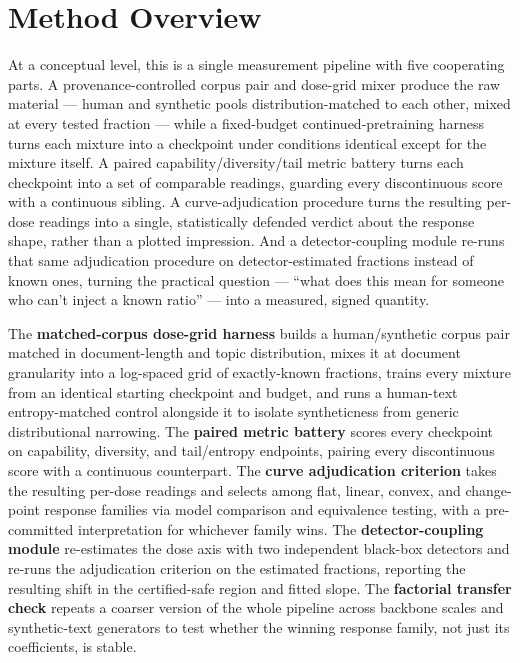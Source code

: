 \documentclass[11pt]{article}
\begin{document}
\section{Method Overview}

At a conceptual level, this is a single measurement pipeline with five cooperating parts. A provenance-controlled corpus pair and dose-grid mixer produce the raw material --- human and synthetic pools distribution-matched to each other, mixed at every tested fraction --- while a fixed-budget continued-pretraining harness turns each mixture into a checkpoint under conditions identical except for the mixture itself. A paired capability/diversity/tail metric battery turns each checkpoint into a set of comparable readings, guarding every discontinuous score with a continuous sibling. A curve-adjudication procedure turns the resulting per-dose readings into a single, statistically defended verdict about the response shape, rather than a plotted impression. And a detector-coupling module re-runs that same adjudication procedure on detector-estimated fractions instead of known ones, turning the practical question --- ``what does this mean for someone who can't inject a known ratio'' --- into a measured, signed quantity.

The \textbf{matched-corpus dose-grid harness} builds a human/synthetic corpus pair matched in document-length and topic distribution, mixes it at document granularity into a log-spaced grid of exactly-known fractions, trains every mixture from an identical starting checkpoint and budget, and runs a human-text entropy-matched control alongside it to isolate syntheticness from generic distributional narrowing. The \textbf{paired metric battery} scores every checkpoint on capability, diversity, and tail/entropy endpoints, pairing every discontinuous score with a continuous counterpart. The \textbf{curve adjudication criterion} takes the resulting per-dose readings and selects among flat, linear, convex, and change-point response families via model comparison and equivalence testing, with a pre-committed interpretation for whichever family wins. The \textbf{detector-coupling module} re-estimates the dose axis with two independent black-box detectors and re-runs the adjudication criterion on the estimated fractions, reporting the resulting shift in the certified-safe region and fitted slope. The \textbf{factorial transfer check} repeats a coarser version of the whole pipeline across backbone scales and synthetic-text generators to test whether the winning response family, not just its coefficients, is stable.
\end{document}
